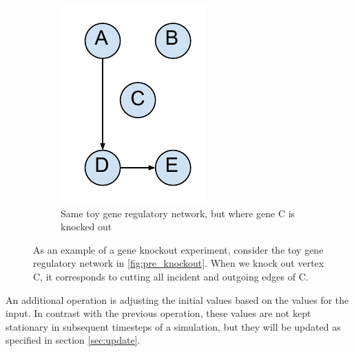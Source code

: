\begin{figure}
\begin{subfigure}[b]{0.3\textwidth}
        \includegraphics[width=\textwidth]{images/Graph_2_to_explain_gene_knockout.pdf}
        \caption{Same toy gene regulatory network, but where gene C is knocked out}
        \label{fig:with_knockout}
    \end{subfigure}
    \caption{ As an example of a gene knockout experiment, consider the toy gene regulatory network in \ref{fig:pre_knockout}. When we knock out vertex C, it corresponds to cutting all incident and outgoing edges of C. }
    \label{fig:explanation_knockout}
\end{figure}
An additional operation is adjusting the initial values based on the values for the input. In contrast with the previous operation, these values are not kept stationary in subsequent timesteps of a simulation, but they will be 
updated as specified in section \ref{sec:update}.
